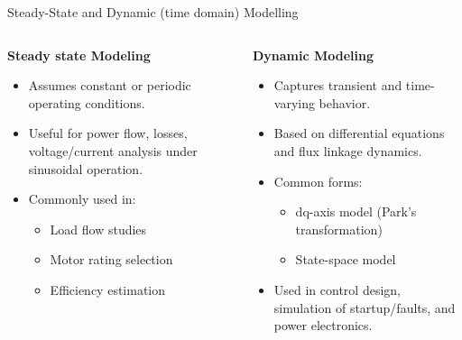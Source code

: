 	\begin{frame}{Steady-State and Dynamic (time domain) Modelling}
		\begin{columns}
		\begin{column}{0.5\textwidth}
			\textbf{Steady state Modeling}
			\begin{itemize}
				\item Assumes constant or periodic operating conditions.
				\item Useful for power flow, losses, voltage/current analysis under sinusoidal operation.
				\item Commonly used in:
				\begin{itemize}
					\item Load flow studies
					\item Motor rating selection
					\item Efficiency estimation
				\end{itemize}
			\end{itemize}
		\end{column}
		\begin{column}{0.5\textwidth}
			\textbf{Dynamic Modeling}
			\begin{itemize}
				\item Captures transient and time-varying behavior.
				\item Based on differential equations and flux linkage dynamics.
				\item Common forms:
				\begin{itemize}
					\item dq-axis model (Park’s transformation)
					\item State-space model
				\end{itemize}
				\item Used in control design, simulation of startup/faults, and power electronics.
			\end{itemize}
		\end{column}
	\end{columns}
\end{frame}
	

